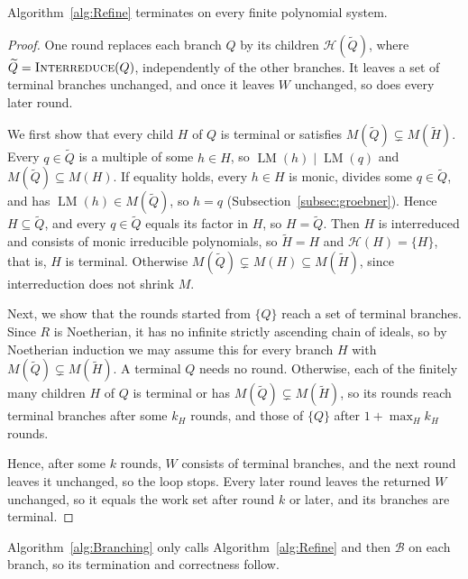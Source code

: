 \begin{theorem}
  \label{thm:refine-termination}
  Algorithm~\ref{alg:Refine} terminates on every finite polynomial system.
\end{theorem}

\begin{proof}
  One round replaces each branch $Q$ by its children
  $\mathcal H(\widetilde Q)$, where $\widetilde Q=\Call{Interreduce}{Q}$,
  independently of the other branches. It leaves a set of terminal branches
  unchanged, and once it leaves $W$ unchanged, so does every later round.

  We first show that every child $H$ of $Q$ is terminal or satisfies
  $M(\widetilde Q)\subsetneq M(\widetilde H)$. Every $q\in\widetilde Q$ is a
  multiple of some $h\in H$, so $\operatorname{LM}(h)\mid\operatorname{LM}(q)$
  and $M(\widetilde Q)\subseteq M(H)$. If equality holds, every $h\in H$ is
  monic, divides some $q\in\widetilde Q$, and has
  $\operatorname{LM}(h)\in M(\widetilde Q)$, so $h=q$
  (Subsection~\ref{subsec:groebner}). Hence $H\subseteq\widetilde Q$, and every
  $q\in\widetilde Q$ equals its factor in $H$, so $H=\widetilde Q$. Then $H$ is
  interreduced and consists of monic irreducible polynomials, so
  $\widetilde H=H$ and $\mathcal H(H)=\{H\}$, that is, $H$ is terminal.
  Otherwise $M(\widetilde Q)\subsetneq M(H)\subseteq M(\widetilde H)$, since
  interreduction does not shrink $M$.

  Next, we show that the rounds started from $\{Q\}$ reach a set of terminal
  branches. Since $R$ is Noetherian, it has no infinite strictly ascending
  chain of ideals, so by Noetherian induction we may assume this for every
  branch $H$ with $M(\widetilde Q)\subsetneq M(\widetilde H)$. A terminal $Q$
  needs no round. Otherwise, each of the finitely many children $H$ of $Q$ is
  terminal or has $M(\widetilde Q)\subsetneq M(\widetilde H)$, so its rounds
  reach terminal branches after some $k_H$ rounds, and those of $\{Q\}$ after
  $1+\max_Hk_H$ rounds.

  Hence, after some $k$ rounds, $W$ consists of terminal branches, and the next
  round leaves it unchanged, so the loop stops. Every later round leaves the
  returned $W$ unchanged, so it equals the work set after round $k$ or later,
  and its branches are terminal.
\end{proof}

Algorithm~\ref{alg:Branching} only calls Algorithm~\ref{alg:Refine} and then
$\mathcal B$ on each branch, so its termination and correctness follow.

